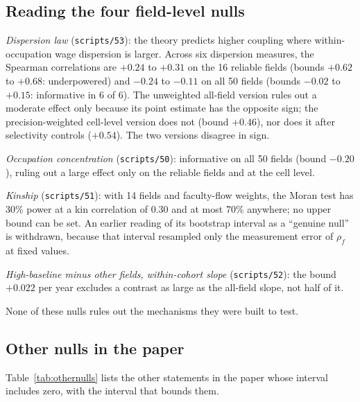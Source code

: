 \documentclass[11pt]{article}
\newcommand{\scr}[1]{\texttt{scripts/#1}}
\begin{document}
\subsection{Reading the four field-level nulls}\label{sec:powerread}

\emph{Dispersion law} (\scr{53}): the theory predicts higher coupling where within-occupation wage dispersion is larger. Across six
dispersion measures, the Spearman correlations are $+0.24$ to $+0.31$ on the 16 reliable fields (bounds $+0.62$ to $+0.68$: underpowered) and
$-0.24$ to $-0.11$ on all 50 fields (bounds $-0.02$ to $+0.15$: informative in 6 of 6). The unweighted all-field version rules out a moderate
effect only because its point estimate has the opposite sign; the precision-weighted cell-level version does not (bound $+0.46$), nor
does it after selectivity controls ($+0.54$). The two versions disagree in sign.

\emph{Occupation concentration} (\scr{50}): informative on all 50 fields (bound $-0.20$), ruling out a large effect only on the reliable
fields and at the cell level.

\emph{Kinship} (\scr{51}): with 14 fields and faculty-flow weights, the Moran test has 30\% power at a kin correlation of 0.30 and at most
70\% anywhere; no upper bound can be set. An earlier reading of its bootstrap interval as a ``genuine null'' is withdrawn, because that
interval resampled only the measurement error of $\rho_f$ at fixed values.

\emph{High-baseline minus other fields, within-cohort slope} (\scr{52}): the bound $+0.022$ per year excludes a contrast as large as the
all-field slope, not half of it.

None of these nulls rules out the mechanisms they were built to test.

\subsection{Other nulls in the paper}\label{sec:othernulls}

Table~\ref{tab:othernulls} lists the other statements in the paper whose interval includes zero, with the interval that bounds them.
\end{document}
